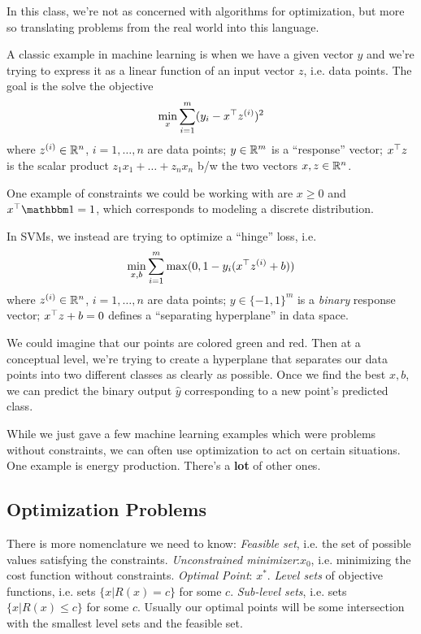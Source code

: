 \documentclass[11 pt]{scrartcl}
\begin{document}
In this class, we're not as concerned with algorithms for optimization, but more so translating problems from the real world into this language. 

\begin{example}
A classic example in machine learning is when we have a given vector $y$ and we're trying to express it as a linear function of an input vector $z$, i.e. data points. 
The goal is the solve the objective 
\[ \min_x \sum_{i=1}^m (y_i - x^\top z^{(i)})^2\] 
where 
\itemnum
    \ii $z^{(i)}\in \mathbb R^n$, $i=1, \dots, n$ are data points; 
    \ii $y\in \mathbb R^m$ is a ``response'' vector; 
    \ii $x^\top z$ is the scalar product $z_1x_1+\dots + z_nx_n$ b/w the two vectors $x,z \in \mathbb R^n$. 
\itemend

One example of constraints we could be working with are $x\geq 0$ and $x^\T \one = 1$, which corresponds to modeling a discrete distribution.

\end{example}

\begin{example}
In SVMs, we instead are trying to optimize a ``hinge'' loss, i.e. 
\[ \min_{x,b} \sum_{i=1}^m \max(0, 1-y_i(x^\top z^{(i)} + b))\] 
where 
\itemnum
    \ii $z^{(i)}\in \mathbb R^n$, $i=1, \dots, n$ are data points; 
    \ii $y\in \{-1, 1\}^m$ is a \emph{binary} response vector; 
    \ii $x^\top z + b = 0$ defines a ``separating hyperplane'' in data space. 
\itemend

We could imagine that our points are colored green and red.
Then at a conceptual level, we're trying to create a hyperplane that separates our data points into two different classes as clearly as possible. 
Once we find the best $x,b$, we can predict the binary output $\hat{y}$ corresponding to a new point's predicted class.
\end{example}

While we just gave a few machine learning examples which were problems without constraints, we can often use optimization to act on certain situations. 
One example is energy production. 
There's a \textbf{lot} of other ones. 


\subsection{Optimization Problems}
There is more nomenclature we need to know: 
\itemnum
    \ii \emph{Feasible set}, i.e. the set of possible values satisfying the constraints. 
    \ii \emph{Unconstrained minimizer}:$x_0$, i.e. minimizing the cost function without constraints. 
    \ii \emph{Optimal Point}: $x^*$. 
    \ii \emph{Level sets} of objective functions, i.e. sets $\{x | R(x) = c\}$ for some $c$. 
    \ii \emph{Sub-level sets}, i.e. sets $\{ x | R(x) \leq c\}$ for some $c$. 
\itemend
Usually our optimal points will be some intersection with the smallest level sets and the feasible set. 
\end{document}
